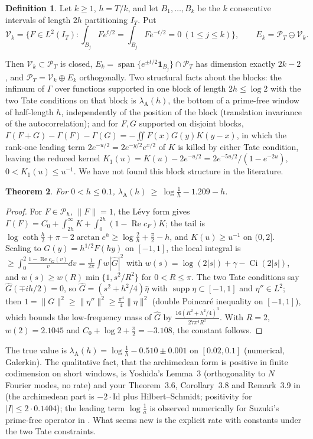 \documentclass[11pt]{amsart}
\newtheorem{theorem}{Theorem}[section]
\theoremstyle{definition}
\newtheorem{definition}[theorem]{Definition}
\theoremstyle{remark}
\newcommand{\Rel}{\operatorname{Re}}
\newcommand{\supp}{\operatorname{supp}}
\newcommand{\IT}{I_T}
\newcommand{\PT}{\mathcal P_T}
\newcommand{\cF}{c_F}
\newcommand{\lamA}{\lambda_{\mathrm A}}
\begin{document}
\begin{definition}
Let $k\ge1$, $h=T/k$, and let $B_1,\dots,B_k$ be the $k$ consecutive intervals of length $2h$ partitioning $\IT$. Put
\[
\mathcal V_k=\Big\{F\in L^2(\IT):\int_{B_j}Fe^{t/2}=\int_{B_j}Fe^{-t/2}=0\ (1\le j\le k)\Big\},\qquad E_k=\PT\ominus\mathcal V_k .
\]
\end{definition}
Then $\mathcal V_k\subset\PT$ is closed, $E_k=\operatorname{span}\{e^{\pm t/2}\mathbf 1_{B_j}\}\cap\PT$ has dimension exactly
$2k-2$, and $\PT=\mathcal V_k\oplus E_k$ orthogonally. Two structural facts about the blocks: the infimum of $\Gamma$ over
functions supported in one block of length $2h\le\log2$ with the two Tate conditions on that block is $\lamA(h)$, the bottom
of a prime-free window of half-length $h$, independently of the position of the block (translation invariance of the
autocorrelation); and for $F,G$ supported on disjoint blocks, $\Gamma(F+G)-\Gamma(F)-\Gamma(G)=-\iint F(x)G(y)K(y-x)$, in which
the rank-one leading term $2e^{-u/2}=2e^{-y/2}e^{x/2}$ of $K$ is killed by either Tate condition, leaving the reduced kernel
$K_1(u)=K(u)-2e^{-u/2}=2e^{-5u/2}/(1-e^{-2u})$, $0<K_1(u)\le u^{-1}$. We have not found this block structure in the literature.

\begin{theorem}\label{thm:A}
For $0<h\le0.1$, $\lamA(h)\ \ge\ \log\frac1h-1.209-h$.
\end{theorem}
\begin{proof}
For $F\in\mathcal P_h$, $\|F\|=1$, the L\'evy form gives $\Gamma(F)=C_0+\int_{2h}^\infty K+\int_0^{2h}(1-\Rel\cF)K$; the tail is
$\log\coth\frac h2+\pi-2\arctan e^h\ge\log\frac2h+\frac\pi2-h$, and $K(u)\ge u^{-1}$ on $(0,2]$. Scaling to
$G(y)=h^{1/2}F(hy)$ on $[-1,1]$, the local integral is $\ge\int_0^2\frac{1-\Rel c_G(v)}vdv=\frac1{2\pi}\int w|\widehat G|^2$ with
$w(s)=\log(2|s|)+\gamma-\operatorname{Ci}(2|s|)$, and $w(s)\ge w(R)\min\{1,s^2/R^2\}$ for $0<R\le\pi$. The two Tate conditions say
$\widehat G(\mp ih/2)=0$, so $\widehat G=(s^2+h^2/4)\widehat\eta$ with $\supp\eta\subset[-1,1]$ and $\eta''\in L^2$; then
$1=\|G\|^2\ge\|\eta''\|^2\ge\frac{\pi^4}4\|\eta\|^2$ (double Poincar\'e inequality on $[-1,1]$), which bounds the low-frequency mass of
$\widehat G$ by $\frac{16(R^2+h^2/4)^3}{27\pi^4R^2}$. With $R=2$, $w(2)=2.1045$ and $C_0+\log2+\frac\pi2=-3.108$, the
constant follows.
\end{proof}
The true value is $\lamA(h)=\log\frac1h-0.510\pm0.001$ on $[0.02,0.1]$ (numerical, Galerkin). The qualitative fact, that
the archimedean form is positive in finite codimension on short windows, is Yoshida's Lemma~3 \cite{Yoshida1992}
(orthogonality to $N$ Fourier modes, no rate) and your Theorem~3.6, Corollary~3.8 and Remark~3.9 in \cite{CC2021} (the archimedean part is
$-2\cdot\mathrm{Id}$ plus Hilbert--Schmidt; positivity for $|I|\le2\cdot0.1404$); the leading term $\log\frac1a$ is observed
numerically for Suzuki's prime-free operator in \cite{Kim2026}. What seems new is the explicit rate with constants under
the two Tate constraints.
\end{document}
